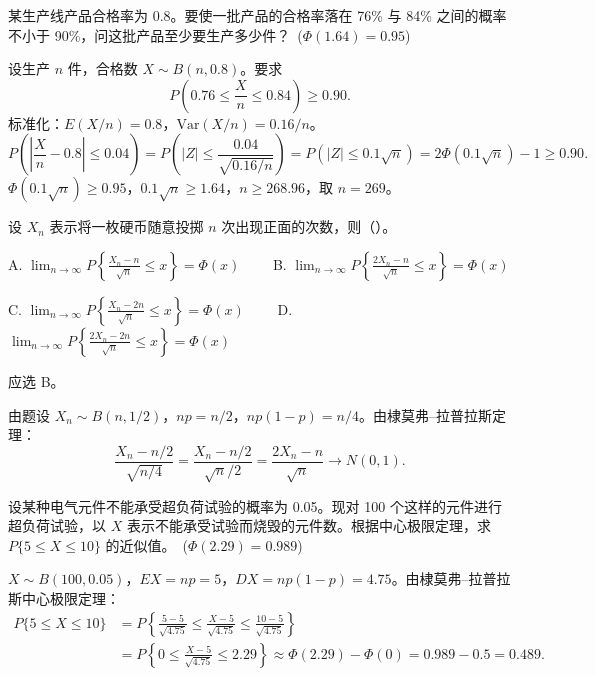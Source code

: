 \documentclass[lang=cn,11pt]{elegantbook}
\begin{document}
\begin{exercise}\label{exer:5-clt-quality}
某生产线产品合格率为 0.8。要使一批产品的合格率落在 76\% 与 84\% 之间的概率不小于 90\%，问这批产品至少要生产多少件？\ (\(\Phi(1.64) = 0.95\))
\end{exercise}
\begin{solution}
设生产 \(n\) 件，合格数 \(X \sim B(n, 0.8)\)。要求
\[
P\!\left(0.76 \leq \frac{X}{n} \leq 0.84\right) \geq 0.90.
\]
标准化：\(E(X/n) = 0.8\)，\(\mathrm{Var}(X/n) = 0.16/n\)。
\[
P\!\left(\left|\frac{X}{n} - 0.8\right| \leq 0.04\right)
= P\!\left(|Z| \leq \frac{0.04}{\sqrt{0.16/n}}\right)
= P(|Z| \leq 0.1\sqrt{n}) = 2\Phi(0.1\sqrt{n}) - 1 \geq 0.90.
\]
\(\Phi(0.1\sqrt{n}) \geq 0.95\)，\(0.1\sqrt{n} \geq 1.64\)，\(n \geq 268.96\)，取 \(n = 269\)。
\end{solution}


\begin{exercise}\label{exer:5-dml-coin}
设 \(X_n\) 表示将一枚硬币随意投掷 \(n\) 次出现正面的次数，则（\quad）。\par
A. \(\displaystyle\lim_{n\to\infty} P\!\left\{\frac{X_n - n}{\sqrt{n}} \leq x\right\} = \Phi(x)\)~~~~
B. \(\displaystyle\lim_{n\to\infty} P\!\left\{\frac{2X_n - n}{\sqrt{n}} \leq x\right\} = \Phi(x)\)\par
C. \(\displaystyle\lim_{n\to\infty} P\!\left\{\frac{X_n - 2n}{\sqrt{n}} \leq x\right\} = \Phi(x)\)~~~~
D. \(\displaystyle\lim_{n\to\infty} P\!\left\{\frac{2X_n - 2n}{\sqrt{n}} \leq x\right\} = \Phi(x)\)
\end{exercise}

\begin{solution}
应选 B。

由题设 \(X_n \sim B(n, 1/2)\)，\(np = n/2\)，\(np(1-p) = n/4\)。由棣莫弗--拉普拉斯定理：
\[
\frac{X_n - n/2}{\sqrt{n/4}} = \frac{X_n - n/2}{\sqrt{n}/2} = \frac{2X_n - n}{\sqrt{n}} \to N(0,1).
\]
\end{solution}


\begin{exercise}\label{exer:5-dml-burn}
设某种电气元件不能承受超负荷试验的概率为 0.05。现对 100 个这样的元件进行超负荷试验，以 \(X\) 表示不能承受试验而烧毁的元件数。根据中心极限定理，求 \(P\{5 \leq X \leq 10\}\) 的近似值。\ (\(\Phi(2.29) = 0.989\))
\end{exercise}
\begin{solution}
\(X \sim B(100, 0.05)\)，\(EX = np = 5\)，\(DX = np(1-p) = 4.75\)。由棣莫弗--拉普拉斯中心极限定理：
\[
\begin{aligned}
P\{5 \leq X \leq 10\}
&= P\!\left\{\frac{5 - 5}{\sqrt{4.75}} \leq \frac{X - 5}{\sqrt{4.75}} \leq \frac{10 - 5}{\sqrt{4.75}}\right\} \\
&= P\!\left\{0 \leq \frac{X - 5}{\sqrt{4.75}} \leq 2.29\right\}
\approx \Phi(2.29) - \Phi(0) = 0.989 - 0.5 = 0.489.
\end{aligned}
\]
\end{solution}
\end{document}
